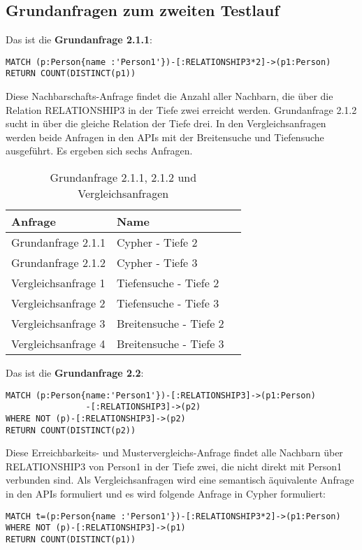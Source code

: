 \subsection{Grundanfragen zum zweiten Testlauf}
Das ist die \textbf{Grundanfrage 2.1.1}: 
\begin{Verbatim}[frame=single]
MATCH (p:Person{name :'Person1'})-[:RELATIONSHIP3*2]->(p1:Person) 
RETURN COUNT(DISTINCT(p1))
\end{Verbatim} 
Diese Nachbarschafts-Anfrage findet die Anzahl aller Nachbarn, die über die Relation RELATIONSHIP3 in der Tiefe zwei erreicht werden. Grundanfrage 2.1.2 sucht in über die gleiche Relation der Tiefe drei. In den Vergleichsanfragen werden beide Anfragen in den APIs mit der Breitensuche und Tiefensuche ausgeführt. Es ergeben sich sechs Anfragen.
\FloatBarrier
\begin{table}[h]
	\centering
	\begin{tabular}{ |p{5cm}||p{5cm}|p{3cm}  }
		\hline
		Anfrage& Name\\
		\hline
		Grundanfrage 2.1.1 &  Cypher - Tiefe 2\\
		Grundanfrage 2.1.2 &  Cypher - Tiefe 3\\
		Vergleichsanfrage 1 &  Tiefensuche - Tiefe 2\\
		Vergleichsanfrage 2 &  Tiefensuche - Tiefe 3\\
		Vergleichsanfrage 3 &  Breitensuche - Tiefe 2\\
		Vergleichsanfrage 4 &  Breitensuche - Tiefe 3\\
		\hline
	\end{tabular}
	\caption{Grundanfrage 2.1.1, 2.1.2 und Vergleichsanfragen}
	\label{tab:Intro_Query2_2}
\end{table}
\FloatBarrier
\noindent Das ist die \textbf{Grundanfrage 2.2}: 
\begin{Verbatim}[frame=single]
MATCH (p:Person{name:'Person1'})-[:RELATIONSHIP3]->(p1:Person)
				-[:RELATIONSHIP3]->(p2)
WHERE NOT (p)-[:RELATIONSHIP3]->(p2) 
RETURN COUNT(DISTINCT(p2))
\end{Verbatim} 
Diese Erreichbarkeits- und Mustervergleichs-Anfrage findet alle Nachbarn über RELATIONSHIP3 von Person1 in der Tiefe zwei, die nicht direkt mit Person1 verbunden sind. Als Vergleichsanfragen wird eine semantisch äquivalente Anfrage in den APIs formuliert und es wird folgende Anfrage in Cypher formuliert: 
\begin{Verbatim}[frame=single]
MATCH t=(p:Person{name :'Person1'})-[:RELATIONSHIP3*2]->(p1:Person)
WHERE NOT (p)-[:RELATIONSHIP3]->(p1)
RETURN COUNT(DISTINCT(p1))
\end{Verbatim}
